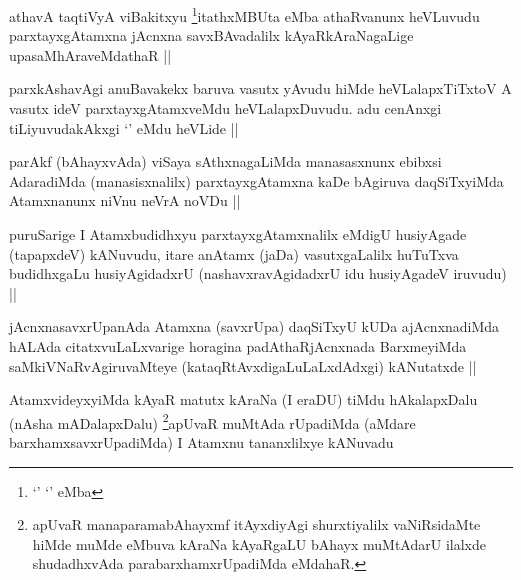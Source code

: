 \begin{artha}
athavA taqtiVyA viBakitxyu \footnote{`\stext' `\stext' eMba}itathxMBUta eMba athaRvanunx heVLuvudu parxtayxgAtamxna jAcnxna savxBAvadalilx kAyaRkAraNagaLige upasaMhAraveMdathaR ||
\end{artha}

\begin{artha}
parxkAshavAgi anuBavakekx baruva vasutx yAvudu hiMde heVLalapxTiTxtoV A vasutx ideV parxtayxgAtamxveMdu heVLalapxDuvudu. adu cenAnxgi tiLiyuvudakAkxgi `\stext' eMdu heVLide ||
\end{artha}


\begin{artha}
parAkf (bAhayxvAda) viSaya sAthxnagaLiMda manasasxnunx ebibxsi AdaradiMda (manasisxnalilx) parxtayxgAtamxna kaDe bAgiruva daqSiTxyiMda Atamxnanunx niVnu neVrA noVDu ||
\end{artha}


\begin{artha}
puruSarige I Atamxbudidhxyu parxtayxgAtamxnalilx eMdigU husiyAgade (tapapxdeV) kANuvudu, itare anAtamx (jaDa) vasutxgaLalilx huTuTxva budidhxgaLu husiyAgidadxrU (nashavxravAgidadxrU idu husiyAgadeV iruvudu) ||
\end{artha}


\begin{artha}
jAcnxnasavxrUpanAda Atamxna (savxrUpa) daqSiTxyU kUDa ajAcnxnadiMda hALAda citatxvuLaLxvarige horagina padAthaRjAcnxnada BarxmeyiMda saMkiVNaRvAgiruvaMteye (kataqRtAvxdigaLuLaLxdAdxgi) kANutatxde ||
\end{artha}

\begin{artha}
AtamxvideyxyiMda kAyaR matutx kAraNa (I eraDU) tiMdu hAkalapxDalu (nAsha mADalapxDalu) \footnote{apUvaR manaparamabAhayxmf itAyxdiyAgi shurxtiyalilx vaNiRsidaMte hiMde muMde eMbuva kAraNa kAyaRgaLU bAhayx muMtAdarU ilalxde shudadhxvAda parabarxhamxrUpadiMda eMdahaR.}apUvaR muMtAda rUpadiMda (aMdare barxhamxsavxrUpadiMda) I Atamxnu tananxlilxye kANuvadu
\end{artha}


